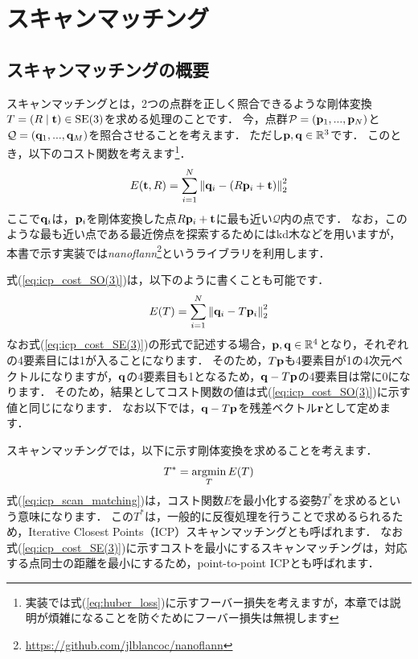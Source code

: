 \chapter{スキャンマッチング}
\label{sec:scan_matching}

\section{スキャンマッチングの概要}

スキャンマッチングとは，2つの点群を正しく照合できるような剛体変換$T = \left( R \mid {\bf t} \right) \in \rm{SE}(3)$を求める処理のことです．
今，点群$\mathcal{P} = ({\bf p}_{1}, ..., {\bf p}_{N})$と$\mathcal{Q} = ({\bf q}_{1}, ..., {\bf q}_{M})$を照合させることを考えます．
ただし${\bf p}, {\bf q} \in \mathbb{R}^{3}$です．
このとき，以下のコスト関数を考えます\footnote{実装では式(\ref{eq:huber_loss})に示すフーバー損失を考えますが，本章では説明が煩雑になることを防ぐためにフーバー損失は無視します}．
%
\begin{align}
  E({\bf t}, R) = \sum_{i=1}^{N} \left\| {\bf q}_{i} - \left( R {\bf p}_{i} + {\bf t} \right) \right\|_{2}^{2}
  \label{eq:icp_cost_SO(3)}
\end{align}
%
ここで${\bf q}_{i}$は，${\bf p}_{i}$を剛体変換した点$R {\bf p}_{i} + {\bf t}$に最も近い$\mathcal{Q}$内の点です．
なお，このような最も近い点である最近傍点を探索するためにはkd木などを用いますが，本書で示す実装では{\it nanoflann}\footnote{ \url{https://github.com/jlblancoc/nanoflann} }というライブラリを利用します．

式(\ref{eq:icp_cost_SO(3)})は，以下のように書くことも可能です．
%
\begin{align}
  E(T) = \sum_{i=1}^{N} \left\| {\bf q}_{i} - T {\bf p}_{i} \right\|_{2}^{2}
  \label{eq:icp_cost_SE(3)}
\end{align}
%
なお式(\ref{eq:icp_cost_SE(3)})の形式で記述する場合，${\bf p}, {\bf q} \in \mathbb{R}^{4}$となり，それぞれの4要素目には1が入ることになります．
そのため，$T {\bf p}$も4要素目が1の4次元ベクトルになりますが，${\bf q}$の4要素目も1となるため，${\bf q} - T {\bf p}$の4要素目は常に0になります．
そのため，結果としてコスト関数の値は式(\ref{eq:icp_cost_SO(3)})に示す値と同じになります．
なお以下では，${\bf q} - T {\bf p}$を残差ベクトル${\bf r}$として定めます．

スキャンマッチングでは，以下に示す剛体変換を求めることを考えます．
%
\begin{align}
  T^{*} = \mathop{\rm argmin}\limits_{T} E(T)
  \label{eq:icp_scan_matching}
\end{align}
%
式(\ref{eq:icp_scan_matching})は，コスト関数$E$を最小化する姿勢$T^{*}$を求めるという意味になります．
この$T^{*}$は，一般的に反復処理を行うことで求めるられるため，Iterative Closest Points（ICP）スキャンマッチングとも呼ばれます．
なお式(\ref{eq:icp_cost_SE(3)})に示すコストを最小にするスキャンマッチングは，対応する点同士の距離を最小にするため，point-to-point ICPとも呼ばれます．

